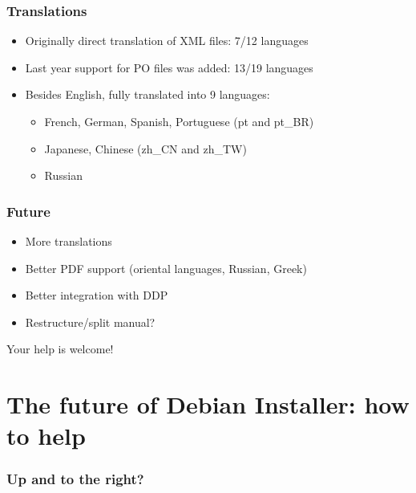 \documentclass{beamer}
\begin{document}
\begin{frame}
  \frametitle{Translations}
	\begin{itemize}
	\item<1->
		Originally direct translation of XML files: 7/12 languages
	\item<2->
		Last year support for PO files was added: 13/19 languages
	\item<3->
		Besides English, fully translated into 9 languages:
		\begin{itemize}
		\item<3->
			French, German, Spanish, Portuguese (pt and pt\_BR)
		\item<3->
			Japanese, Chinese (zh\_CN and zh\_TW)
		\item<3->
			Russian
		\end{itemize}
	\end{itemize}
\end{frame}

\begin{frame}
  \frametitle{Future}
	\begin{itemize}[<+->]
	\item
		More translations
	\item
		Better PDF support (oriental languages, Russian, Greek)
	\item
		Better integration with DDP
	\item
		Restructure/split manual?
	\end{itemize}
    \vspace{1cm}
	
	\huge{Your help is welcome!}
\end{frame}


\section{The future of Debian Installer: how to help}

\begin{frame}
  \frametitle{Up and to the right?}
\end{frame}
\end{document}
